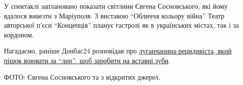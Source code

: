 У спектаклі заплановано показати світлини Євгена Сосновського, які йому вдалося
вивезти з Маріуполя. З виставою \enquote{Обличчя кольору війна} Театр авторської п'єси
\enquote{Концепція} планує гастролі як в українських містах, так і за кордоном.



Нагадаємо, раніше Донбас24 розповідав про \href{https://donbas24.news/news/lugancanin-recidivist-pisov-voyuvati-za-lnr-shhob-zarobiti-na-vstavni-zubi}{луганчанина-рецидивіста, який пішов
воювати за \enquote{лнр}, щоб заробити на вставні зуби}.

ФОТО: Євгена Сосновського та з відкритих джерел.

